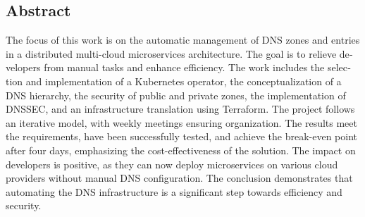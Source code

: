 
\begin{otherlanguage}{american}
	\chapter*{Abstract}
	The focus of this work is on the automatic management of DNS zones and entries in a distributed multi-cloud microservices architecture.
	\medskip
	The goal is to relieve developers from manual tasks and enhance efficiency.
	\medskip
	The work includes the selection and implementation of a Kubernetes operator, the conceptualization of a DNS hierarchy,
	the security of public and private zones, the implementation of DNSSEC, and an infrastructure translation using Terraform.
	The project follows an iterative model, with weekly meetings ensuring organization.
	\medskip
	The results meet the requirements, have been successfully tested, and achieve the break-even point after four days,
	emphasizing the cost-effectiveness of the solution.
	The impact on developers is positive, as they can now deploy microservices on various cloud providers without manual DNS configuration.
	\medskip
	The conclusion demonstrates that automating the DNS infrastructure is a significant step towards efficiency and security.
\end{otherlanguage}

